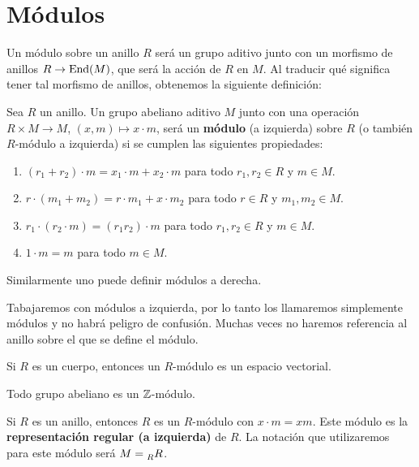\chapter{Módulos}
\label{modulos}

Un módulo sobre un anillo $R$ será un grupo aditivo junto con un morfismo
de anillos $R\to\operatorname{End}(M)$, que será la acción de $R$ en $M$. Al traducir
qué significa tener tal morfismo de anillos, obtenemos la siguiente definición:

\begin{definition}
Sea $R$ un anillo. Un grupo abeliano aditivo $M$ junto con una operación
$R\times M\to M$, $(x,m)\mapsto x\cdot m$, 
será un \textbf{módulo} (a izquierda) sobre $R$ (o también $R$-módulo a izquierda) si
se cumplen las siguientes propiedades:
\begin{enumerate}
\item $(r_1+r_2)\cdot m=x_1\cdot m+x_2\cdot m$ para todo $r_1,r_2\in R$ y $m\in M$.
\item $r\cdot (m_1+m_2)=r\cdot m_1+x\cdot m_2$ para todo $r\in R$ y $m_1,m_2\in M$.
\item $r_1\cdot (r_2\cdot m)=(r_1r_2)\cdot m$ para todo $r_1,r_2\in R$ y $m\in M$.
\item $1\cdot m=m$ para todo $m\in M$.	
\end{enumerate}
\end{definition}

Similarmente uno puede definir módulos a derecha. 

Tabajaremos con módulos a izquierda, por lo tanto los llamaremos simplemente módulos y no habrá peligro de confusión.  Muchas veces no haremos referencia al anillo
sobre el que se define el módulo.

\begin{example}
Si $R$ es un cuerpo, entonces un $R$-módulo 	es un espacio vectorial. 
\end{example}

\begin{example}
Todo grupo abeliano es un $\mathbb{Z}$-módulo.	
\end{example}

\begin{example}
Si $R$ es un anillo, entonces $R$ es un $R$-módulo con $x\cdot m=xm$. 
Este módulo es la \textbf{representación regular (a izquierda)} de $R$.  
La notación que utilizaremos para este módulo será $M=\prescript{}{R}R$. 
\end{example}

